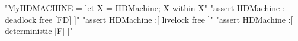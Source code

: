 \begin{assert}
  "MyHDMACHINE = let X = HDMachine; X within X"
  \also "assert HDMachine :[ deadlock free [FD] ]"
  \also "assert HDMachine :[ livelock free ]"
  \also "assert HDMachine :[ deterministic [F] ]"
\end{assert}

